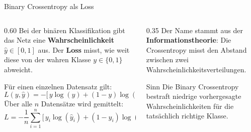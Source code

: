 \begin{frame}{Binary Crossentropy als Loss}
\begin{columns}
\begin{column}{0.60\textwidth}
Bei der binären Klassifikation gibt das Netz eine \textbf{Wahrscheinlichkeit} $\hat{y} \in [0,1]$ aus. Der \textbf{Loss} misst, wie weit diese von der wahren Klasse $y \in \{0,1\}$ abweicht.

\vspace{0.5em}
Für einen einzelnen Datensatz gilt:
\[
L(y, \hat{y}) = -\big[\, y \log(\hat{y}) + (1-y)\log(1-\hat{y}) \,\big]
\]
Über alle $n$ Datensätze wird gemittelt:
\[
L = -\frac{1}{n}\sum_{i=1}^{n} \big[\, y_i \log(\hat{y}_i) + (1-y_i)\log(1-\hat{y}_i) \,\big]
\]
\end{column}
\begin{column}{0.35\textwidth}
Der Name stammt aus der \textbf{Informationstheorie}: Die Crossentropy misst den Abstand zwischen zwei Wahrscheinlichkeitsverteilungen.\par\medskip

\begin{block}{Sinn}
  Die Binary Crossentropy bestraft niedrige vorhergesagte Wahrscheinlichkeiten für die tatsächlich richtige Klasse.
\end{block}

\end{column}
\end{columns}
\end{frame}

